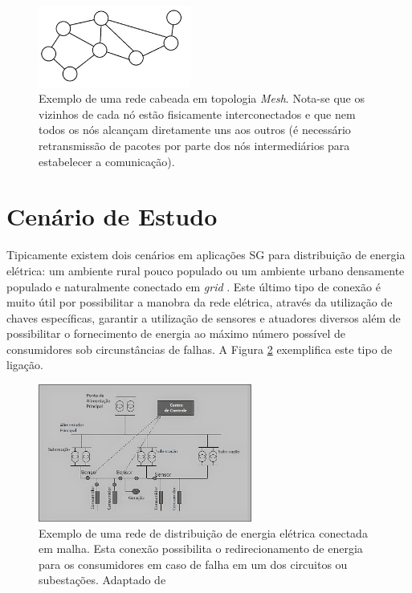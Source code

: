 \documentclass[12pt]{article}
\begin{document}
\begin{figure} %
	\centering
	\includegraphics[width=5cm]{Rede_Mesh}
	\caption{Exemplo de uma rede cabeada em topologia \emph{Mesh}. Nota-se que os vizinhos de cada nó estão fisicamente interconectados e que nem todos os nós alcançam diretamente uns aos outros (é necessário retransmissão de pacotes por parte dos nós intermediários para estabelecer a comunicação).}
	\label{fig_rede_mesh}
\end{figure}

\section{Cenário de Estudo}
\label{sec:Ambientacao}
Tipicamente existem dois cenários em aplicações SG para distribuição de energia elétrica: um ambiente rural pouco populado ou um ambiente urbano densamente populado e naturalmente conectado em \emph{grid} \cite{Conf_Sood2009}. Este último tipo de conexão é muito útil por possibilitar a manobra da rede elétrica, através da utilização de chaves específicas, garantir a utilização de sensores e atuadores diversos além de possibilitar o fornecimento de energia ao máximo número possível de consumidores sob circunstâncias de falhas. A Figura \ref{fig_rede_distribuicao} exemplifica este tipo de ligação.

\begin{figure} %
	\centering
	\includegraphics[width=7cm]{Rede_Distribuicao}
	\caption{Exemplo de uma rede de distribuição de energia elétrica conectada em malha. Esta conexão possibilita o redirecionamento de energia para os consumidores em caso de falha em um dos circuitos ou subestações. Adaptado de \cite{Mag_Bouhafs2012}}
	\label{fig_rede_distribuicao}
\end{figure}
\end{document}

